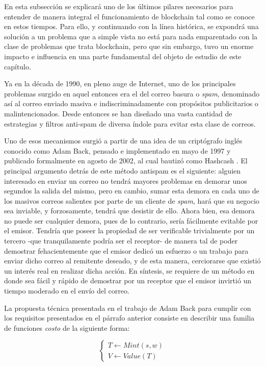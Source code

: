 En esta subsección se explicará uno de los últimos pilares necesarios para entender de manera integral el funcionamiento de blockchain tal como se conoce en estos tiempos. Para ello, y continuando con la línea histórica, se expondrá una solución a un problema que a simple vista no está para nada emparentado con la clase de problemas que trata blockchain, pero que sin embargo, tuvo un enorme impacto e influencia en una parte fundamental del objeto de estudio de este capítulo.

Ya en la década de 1990, en pleno auge de Internet, uno de los principales problemas surgido en aquel entonces era el del correo basura o \textit{spam}, denominado así al correo enviado masiva e indiscriminadamente con propósitos publicitarios o malintencionados. Desde entonces se han diseñado una vasta cantidad de estrategias y filtros anti-spam de diversa índole para evitar esta clase de correos.

Uno de esos mecanismos surgió a partir de una idea de un criptógrafo inglés conocido como Adam Back, pensado e implementado en mayo de 1997 y publicado formalmente en agosto de 2002, al cual bautizó como Hashcash \cite{Back2002}. El principal argumento detrás de este método antispam es el siguiente: alguien interesado en enviar un correo no tendrá mayores problemas en demorar unos segundos la salida del mismo, pero en cambio, sumar esta demora en cada uno de los masivos correos salientes por parte de un cliente de \textit{spam}, hará que su negocio sea inviable, y forzosamente, tendrá que desistir de ello. Ahora bien, esa demora no puede ser cualquier demora, pues de lo contrario, sería fácilmente evitable por el emisor. Tendría que poseer la propiedad de ser verificable trivialmente por un tercero -que tranquilamente podría ser el receptor- de manera tal de poder demostrar fehacientemente que el emisor dedicó un esfuerzo o un trabajo para enviar dicho correo al remitente deseado, y de esta manera, cerciorarse que existió un interés real en realizar dicha acción. En síntesis, se requiere de un método en donde sea fácil y rápido de demostrar por un receptor que el emisor invirtió un tiempo moderado en el envío del correo.

La propuesta técnica presentada en el trabajo de Adam Back para cumplir con los requisitos presentados en el párrafo anterior consiste en describir una familia de funciones \textit{costo} de la siguiente forma:

\begin{equation} \label{eq:funciones-costo}
  \begin{cases*}
    T \leftarrow Mint(s, w)\\
    V \leftarrow Value(T)
  \end{cases*}
\end{equation}

